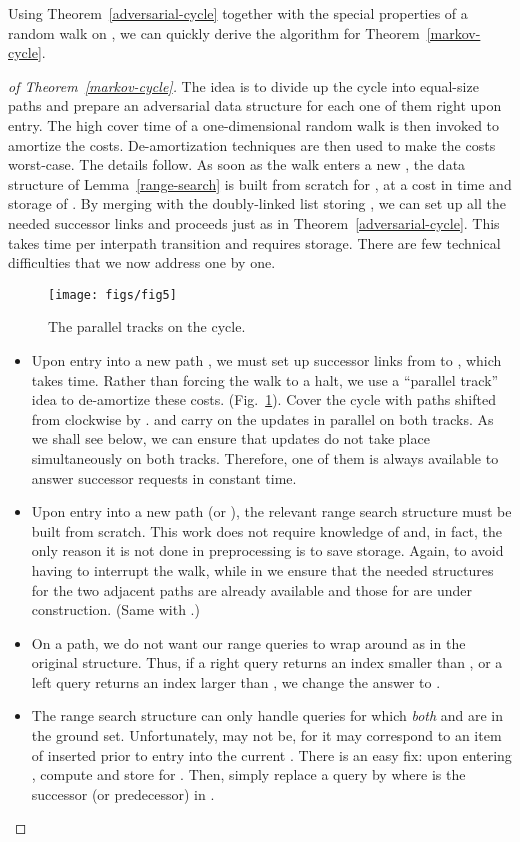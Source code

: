 \documentclass[oribibl,envcountsect,envcountsame]{llncs}
\begin{document}
Using Theorem~\ref{adversarial-cycle} together
with the special properties of a random walk on ,
we can quickly derive the algorithm for Theorem~\ref{markov-cycle}.

\begin{proof}[of Theorem~\ref{markov-cycle}]
The idea is to divide up the cycle
into  equal-size paths 
and prepare an adversarial data structure for 
each one of them right upon entry. The high
cover time of a one-dimensional random walk 
is then invoked to amortize the costs.
De-amortization techniques are then used to make the costs worst-case.
The details follow. As soon as the walk enters
a new , the data structure of Lemma~\ref{range-search}
is built from scratch for , at a cost in
time and storage of .
By merging  with the doubly-linked list
storing , we can set up all the needed successor links
and proceeds just as in Theorem~\ref{adversarial-cycle}.
This takes  time per interpath transition
and requires  storage.
There are few technical difficulties that we now
address one by one.

\begin{figure}[ht]
\begin{center}
\texttt{[image: figs/fig5]}
\end{center}
\caption{The parallel tracks on the cycle.}
\label{fig:fig5}
\end{figure}


\begin{itemize}
\item
Upon entry into a new path , we must set up 
successor links from  to , which takes  time.
Rather than forcing the walk to a halt, we use a ``parallel track'' idea
to de-amortize these costs. (Fig.~\ref{fig:fig5}).
Cover the cycle with paths  shifted from
 clockwise by .
and carry on the updates in parallel on both tracks.
As we shall see below, we can ensure that
updates do not take place simultaneously on both tracks.
Therefore, one of them is always
available to answer successor requests in constant time.
\item
Upon entry into a new path  (or ),
the relevant range search structure must be built from scratch.
This work does not require knowledge of 
and, in fact, the only reason
it is not done in preprocessing is to save storage.
Again, to avoid having to interrupt the walk,
while in  we ensure that the needed
structures for the two adjacent paths  are already available
and those for  are under construction.
(Same with .) 
\item
On a path, we do not want our range queries to wrap around as 
in the original structure. Thus, if a right query returns an index
smaller than , or a left query returns an index larger than ,
we change the answer to .
\item
The range search structure can only handle queries  for which
{\em both}  and  are in the ground set. Unfortunately,  may not be,
for it may correspond to an item of  inserted prior
to entry into the current .
There is an easy fix: upon entering , compute and store
 for .
Then, simply replace a query  by  where 
is the successor (or predecessor) in .
\end{itemize}


\end{proof}
\end{document}
